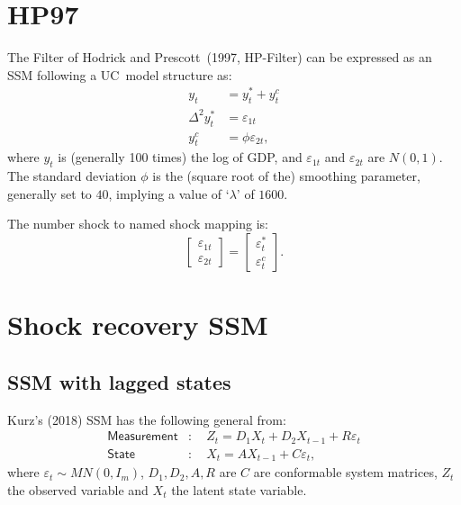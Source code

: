 \documentclass[a4paper,12pt]{article}
\newcommand{\bsq}{\begin{subequations}}\newcommand{\esq}{\end{subequations}}
\begin{document}
\section{HP97}

The Filter of Hodrick and Prescott\ (1997, HP-Filter) can be expressed as an
SSM following a UC\ model structure as:\bsq\label{HP0}%
\begin{align}
y_{t}& =y_{t}^{\ast }+y_{t}^{c}  \label{HP0a} \\
\Delta ^{2}y_{t}^{\ast }& =\varepsilon _{1t}  \label{HP0b} \\
y_{t}^{c}& =\phi \varepsilon _{2t},  \label{HP0c}
\end{align}%
\esq where $y_{t}$ is (generally 100 times) the log of GDP, and $\varepsilon
_{1t}$ and $\varepsilon _{2t}$ are $N(0,1)$. The standard deviation $\phi $
is the (square root of the) smoothing parameter, generally set to $40$,
implying a value of `$\lambda $' of $1600$.

The number shock to named shock mapping is:%
\begin{equation}
\begin{bmatrix}
\varepsilon _{1t} \\ 
\varepsilon _{2t}%
\end{bmatrix}%
=%
\begin{bmatrix}
\varepsilon _{t}^{\ast } \\ 
\varepsilon _{t}^{c}%
\end{bmatrix}%
.
\end{equation}

\section{Shock recovery SSM}

\subsection{SSM with lagged states}

Kurz's (2018) SSM has the following general from:\bsq\label{SSM}%
\begin{align}
\mathsf{Measurement}& :\quad Z_{t}=D_{1}X_{t}+D_{2}X_{t-1}+R\varepsilon _{t}
\label{ssm1} \\
\mathsf{State}& :\quad X_{t}=AX_{t-1}+C\varepsilon _{t},  \label{ssm2}
\end{align}%
\esq where $\varepsilon _{t}\sim MN(0,I_{m})$, $D_{1},D_{2},A,R$ are $C$ are
conformable system matrices, $Z_{t}$ the observed variable and $X_{t}$ the
latent state variable.
\end{document}
